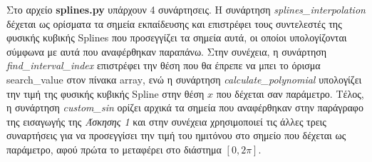 \documentclass[Second Project.tex]{subfiles}
\begin{document}
\vspace{10mm}
Στο αρχείο \textlatin{\textbf{splines.py}} υπάρχουν 4 συνάρτησεις. Η συνάρτηση 
\textlatin{\textit{splines\_interpolation}} δέχεται ως ορίσματα τα σημεία εκπαίδευσης και επιστρέφει τους συντελεστές της φυσικής κυβικής 
\textlatin{Splines} που προσεγγίζει τα σημεία αυτά, οι οποίοι υπολογίζονται σύμφωνα με αυτά που αναφέρθηκαν παραπάνω. Στην συνέχεια, η 
συνάρτηση \textlatin{\textit{find\_interval\_index}} επιστρέφει την θέση που θα έπρεπε να μπει το όρισμα \textlatin{search\_value} στον πίνακα
\textlatin{array}, ενώ η συνάρτηση \textlatin{\textit{calculate\_polynomial}} υπολογίζει την τιμή της φυσικής κυβικής \textlatin{Spline} στην 
θέση $x$ που δέχεται σαν παράμετρο. Τέλος, η συνάρτηση \textlatin{\textit{custom\_sin}} ορίζει αρχικά τα σημεία που αναφέρθηκαν στην παράγραφο
της εισαγωγής της \textit{Άσκησης 1} και στην συνέχεια χρησιμοποιεί τις άλλες τρεις συναρτήσεις για να προσεγγίσει την τιμή του ημιτόνου στο 
σημείο που δέχεται ως παράμετρο, αφού πρώτα το μεταφέρει στο διάστημα $[0,2\pi]$. 
\newpage
\end{document}
